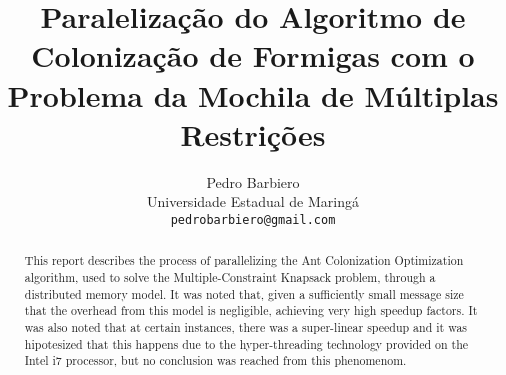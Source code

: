 \documentclass[12pt,a4paper]{article}
\begin{document}
\title{Paralelização do Algoritmo de Colonização de Formigas com o Problema da Mochila de Múltiplas Restrições}

\author{Pedro Barbiero\\
	Universidade Estadual de Maringá\\
	{\tt pedrobarbiero@gmail.com}
}

\maketitle

\begin{abstract}
	This report describes the process of parallelizing the Ant Colonization Optimization algorithm, used to solve the Multiple-Constraint Knapsack problem, through a distributed memory model. It was noted that, given a sufficiently small message size that the overhead from this model is negligible, achieving very high speedup factors. It was also noted that at certain instances, there was a super-linear speedup and it was hipotesized that this happens due to the hyper-threading technology provided on the Intel i7 processor, but no conclusion was reached from this phenomenom.
	
\end{abstract}
















\end{document}
